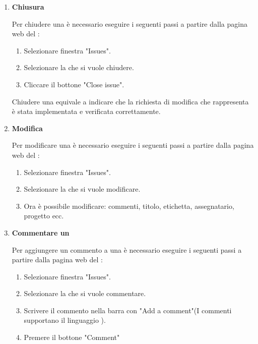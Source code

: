 \begin{enumerate}
    \item \textbf{Chiusura}
    
    Per chiudere una  è necessario eseguire i seguenti passi a partire dalla pagina web del :
    \begin{enumerate}
        \item Selezionare finestra "Issues".
        \item Selezionare la  che si vuole chiudere.
        \item Cliccare il bottone "Close issue".
    \end{enumerate}
    Chiudere una  equivale a indicare che la richiesta di modifica che rappresenta è stata implementata e verificata correttamente.

    \item \textbf{Modifica}
    
    Per modificare una  è necessario eseguire i seguenti passi a partire dalla pagina web del :
    \begin{enumerate}
        \item Selezionare finestra "Issues".
        \item Selezionare la  che si vuole modificare.
        \item Ora è possibile modificare: commenti, titolo, etichetta, assegnatario, progetto ecc.
    \end{enumerate}

    \item \textbf{Commentare un }
    \label{item:commentare_issue}
    
    Per aggiungere un commento a una  è necessario eseguire i seguenti passi a partire dalla pagina web del :
    \begin{enumerate}
        \item Selezionare finestra "Issues".
        \item Selezionare la  che si vuole commentare.
        \item Scrivere il commento nella barra con  "Add a comment"(I commenti supportano il linguaggio ).
        \item Premere il bottone "Comment"
    \end{enumerate}
\end{enumerate}

